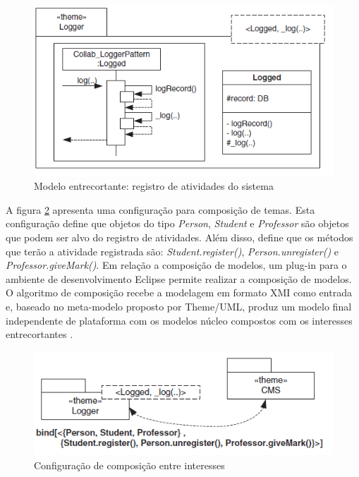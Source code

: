 \begin{figure}
	\centering
	\includegraphics{img/theme_2.png}
	\caption{Modelo entrecortante: registro de atividades do sistema}\label{fig:theme_2}
\end{figure}

A figura \ref{fig:theme_3} apresenta uma configuração para composição de temas. Esta configuração define que objetos do tipo \textit{Person},
\textit{Student} e \textit{Professor} são objetos que podem ser alvo do registro de atividades. Além disso, define que os métodos que terão a
atividade registrada são: \textit{Student.register()}, \textit{Person.unregister()} e \textit{Professor.giveMark()}. Em relação a composição de
modelos, um plug-in para o ambiente de desenvolvimento Eclipse \cite{Eclipse} permite realizar a composição de modelos. O algoritmo de composição
recebe a modelagem em formato XMI como entrada e, baseado no meta-modelo proposto por Theme/UML, produz um modelo final independente de plataforma com
os modelos núcleo compostos com os interesses entrecortantes \cite{Carton:2009:MT:1692821.1692829}. 

\begin{figure}
	\centering
	\includegraphics{img/theme_3.png}
	\caption{Configuração de composição entre interesses}\label{fig:theme_3}
\end{figure}

